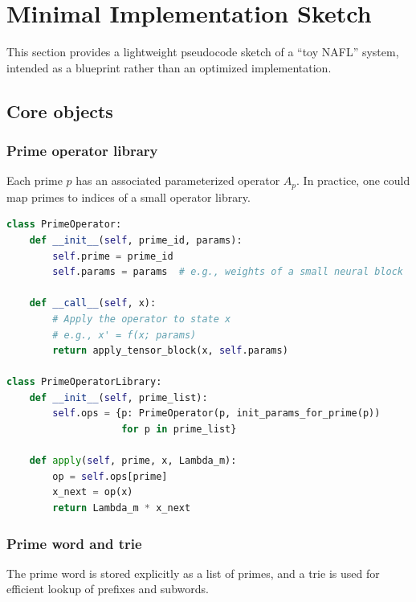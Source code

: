 \documentclass[11pt]{article}
\begin{document}
\section{Minimal Implementation Sketch}

This section provides a lightweight pseudocode sketch of a ``toy NAFL'' system, intended as a blueprint rather than an optimized implementation.

\subsection{Core objects}

\subsubsection{Prime operator library}

Each prime \(p\) has an associated parameterized operator \(A_p\).
In practice, one could map primes to indices of a small operator library.

\begin{lstlisting}[language=Python, caption={Toy prime operator library interface}]
class PrimeOperator:
    def __init__(self, prime_id, params):
        self.prime = prime_id
        self.params = params  # e.g., weights of a small neural block

    def __call__(self, x):
        # Apply the operator to state x
        # e.g., x' = f(x; params)
        return apply_tensor_block(x, self.params)

class PrimeOperatorLibrary:
    def __init__(self, prime_list):
        self.ops = {p: PrimeOperator(p, init_params_for_prime(p))
                    for p in prime_list}

    def apply(self, prime, x, Lambda_m):
        op = self.ops[prime]
        x_next = op(x)
        return Lambda_m * x_next
\end{lstlisting}

\subsubsection{Prime word and trie}

The prime word is stored explicitly as a list of primes, and a trie is used for efficient lookup of prefixes and subwords.
\end{document}
